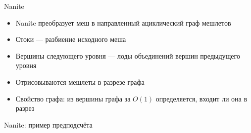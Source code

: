 \begin{frame}{Nanite}
    \begin{itemize}
        \item Nanite преобразует меш в направленный ациклический граф мешлетов
        \item Стоки --- разбиение исходного меша
        \item Вершины следующего уровня --- лоды объединений вершин предыдущего уровня
        \item Отрисовываются мешлеты в разрезе графа
        \item Свойство графа: из вершины графа за $O(1)$ определяется, входит ли она в разрез
    \end{itemize}
    \begin{center}
        
        
    \end{center}
\end{frame}

\begin{frame}{Nanite: пример предподсчёта}
    \centering
    
    
    
    
\end{frame}
